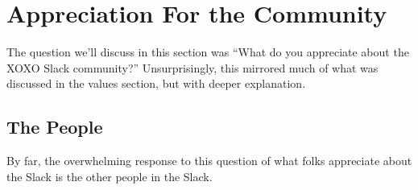 \documentclass[
]{book}
\begin{document}
\chapter{Appreciation For the Community}\label{appreciation-for-the-community}

The question we'll discuss in this section was ``What do you appreciate about the XOXO Slack community?'' Unsurprisingly, this mirrored much of what was discussed in the values section, but with deeper explanation.

\section{The People}\label{the-people}

By far, the overwhelming response to this question of what folks appreciate about the Slack is the other people in the Slack.
\end{document}
